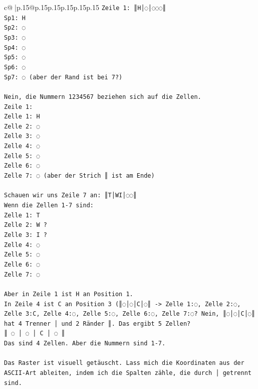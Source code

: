 \documentclass{article}
\begin{document}
{\begin{supertabular}{c@{$\;$}|p{.15\linewidth}@{}p{.15\linewidth}p{.15\linewidth}p{.15\linewidth}p{.15\linewidth}p{.15\linewidth}}
{{{\texttt{Zeile 1: ║H│◌│◌◌◌║} \\
\texttt{Sp1: H} \\
\texttt{Sp2: ◌} \\
\texttt{Sp3: ◌} \\
\texttt{Sp4: ◌} \\
\texttt{Sp5: ◌} \\
\texttt{Sp6: ◌} \\
\texttt{Sp7: ◌ (aber der Rand ist bei 7?)} \\
\\ 
\texttt{Nein, die Nummern 1234567 beziehen sich auf die Zellen.} \\
\texttt{Zeile 1:} \\
\texttt{Zelle 1: H} \\
\texttt{Zelle 2: ◌} \\
\texttt{Zelle 3: ◌} \\
\texttt{Zelle 4: ◌} \\
\texttt{Zelle 5: ◌} \\
\texttt{Zelle 6: ◌} \\
\texttt{Zelle 7: ◌ (aber der Strich ║ ist am Ende)} \\
\\ 
\texttt{Schauen wir uns Zeile 7 an: ║T│WI│◌◌║} \\
\texttt{Wenn die Zellen 1{-}7 sind:} \\
\texttt{Zelle 1: T} \\
\texttt{Zelle 2: W ?} \\
\texttt{Zelle 3: I ?} \\
\texttt{Zelle 4: ◌} \\
\texttt{Zelle 5: ◌} \\
\texttt{Zelle 6: ◌} \\
\texttt{Zelle 7: ◌} \\
\\ 
\texttt{Aber in Zeile 1 ist H an Position 1.} \\
\texttt{In Zeile 4 ist C an Position 3 (║◌│◌│C│◌║ {-}> Zelle 1:◌, Zelle 2:◌, Zelle 3:C, Zelle 4:◌, Zelle 5:◌, Zelle 6:◌, Zelle 7:◌? Nein, ║◌│◌│C│◌║ hat 4 Trenner │ und 2 Ränder ║. Das ergibt 5 Zellen?} \\
\texttt{║ ◌ │ ◌ │ C │ ◌ ║} \\
\texttt{Das sind 4 Zellen. Aber die Nummern sind 1{-}7.} \\
\\ 
\texttt{Das Raster ist visuell getäuscht. Lass mich die Koordinaten aus der ASCII{-}Art ableiten, indem ich die Spalten zähle, die durch │ getrennt sind.} \\
}}}
\end{supertabular}}
\end{document}
